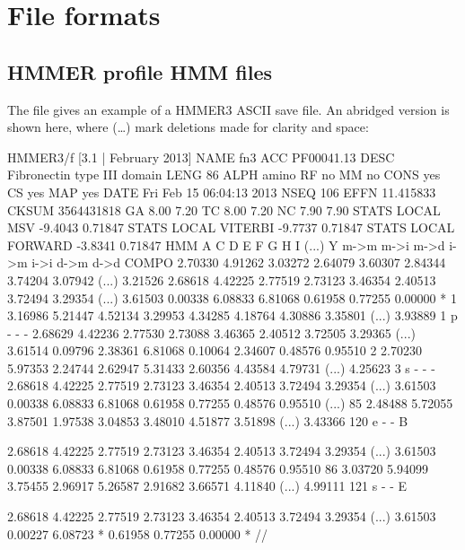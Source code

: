 \chapter{File formats}
\label{chapter:formats}
\setcounter{footnote}{0}

\section{HMMER profile HMM files}
\label{section:savefiles}

The file  gives an example of a HMMER3 ASCII
save file. An abridged version is shown here, where (\ldots) mark
deletions made for clarity and space:

\begin{tinysreoutput}
HMMER3/f [3.1 | February 2013]
NAME  fn3
ACC   PF00041.13
DESC  Fibronectin type III domain
LENG  86
ALPH  amino
RF    no
MM    no
CONS  yes
CS    yes
MAP   yes
DATE  Fri Feb 15 06:04:13 2013
NSEQ  106
EFFN  11.415833
CKSUM 3564431818
GA    8.00 7.20
TC    8.00 7.20
NC    7.90 7.90
STATS LOCAL MSV       -9.4043  0.71847
STATS LOCAL VITERBI   -9.7737  0.71847
STATS LOCAL FORWARD   -3.8341  0.71847
HMM          A        C        D        E        F        G        H        I    (...)    Y   
            m->m     m->i     m->d     i->m     i->i     d->m     d->d
  COMPO   2.70330  4.91262  3.03272  2.64079  3.60307  2.84344  3.74204  3.07942 (...) 3.21526
          2.68618  4.42225  2.77519  2.73123  3.46354  2.40513  3.72494  3.29354 (...) 3.61503
          0.00338  6.08833  6.81068  0.61958  0.77255  0.00000        *
      1   3.16986  5.21447  4.52134  3.29953  4.34285  4.18764  4.30886  3.35801 (...) 3.93889      1 p - - -
          2.68629  4.42236  2.77530  2.73088  3.46365  2.40512  3.72505  3.29365 (...) 3.61514
          0.09796  2.38361  6.81068  0.10064  2.34607  0.48576  0.95510
      2   2.70230  5.97353  2.24744  2.62947  5.31433  2.60356  4.43584  4.79731 (...) 4.25623      3 s - - -
          2.68618  4.42225  2.77519  2.73123  3.46354  2.40513  3.72494  3.29354 (...) 3.61503
          0.00338  6.08833  6.81068  0.61958  0.77255  0.48576  0.95510
(...)
     85   2.48488  5.72055  3.87501  1.97538  3.04853  3.48010  4.51877  3.51898 (...) 3.43366    120 e - - B
     
          2.68618  4.42225  2.77519  2.73123  3.46354  2.40513  3.72494  3.29354 (...) 3.61503
          0.00338  6.08833  6.81068  0.61958  0.77255  0.48576  0.95510
     86   3.03720  5.94099  3.75455  2.96917  5.26587  2.91682  3.66571  4.11840 (...) 4.99111    121 s - - E
     
          2.68618  4.42225  2.77519  2.73123  3.46354  2.40513  3.72494  3.29354 (...) 3.61503
          0.00227  6.08723        *  0.61958  0.77255  0.00000        *
//
\end{tinysreoutput}


